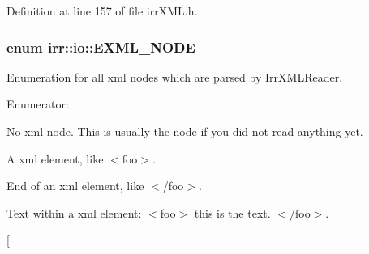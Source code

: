 Definition at line 157 of file irrXML.h.\hypertarget{namespaceirr_1_1io_86a02676c9cbb822e04d60c81b4f33ed}{
\subsubsection[{EXML\_\-NODE}]{\setlength{\rightskip}{0pt plus 5cm}enum {\bf irr::io::EXML\_\-NODE}}}
\label{namespaceirr_1_1io_86a02676c9cbb822e04d60c81b4f33ed}


Enumeration for all xml nodes which are parsed by IrrXMLReader. 

\begin{Desc}
\item[Enumerator: ]\par
\begin{description}
\item[{\em 
\hypertarget{namespaceirr_1_1io_86a02676c9cbb822e04d60c81b4f33eda7f8e643a481d9c8b75a25499f40235c}{
EXN\_\-NONE}
\label{namespaceirr_1_1io_86a02676c9cbb822e04d60c81b4f33eda7f8e643a481d9c8b75a25499f40235c}
}]No xml node. This is usually the node if you did not read anything yet. \item[{\em 
\hypertarget{namespaceirr_1_1io_86a02676c9cbb822e04d60c81b4f33ed9df4f5baccc23a0ad1f6fa64d8de2fc0}{
EXN\_\-ELEMENT}
\label{namespaceirr_1_1io_86a02676c9cbb822e04d60c81b4f33ed9df4f5baccc23a0ad1f6fa64d8de2fc0}
}]A xml element, like $<$foo$>$. \item[{\em 
\hypertarget{namespaceirr_1_1io_86a02676c9cbb822e04d60c81b4f33ed54ef1997279f08180634f4a897f771b8}{
EXN\_\-ELEMENT\_\-END}
\label{namespaceirr_1_1io_86a02676c9cbb822e04d60c81b4f33ed54ef1997279f08180634f4a897f771b8}
}]End of an xml element, like $<$/foo$>$. \item[{\em 
\hypertarget{namespaceirr_1_1io_86a02676c9cbb822e04d60c81b4f33ed0edf973f8ca0f6097f69369539d432a4}{
EXN\_\-TEXT}
\label{namespaceirr_1_1io_86a02676c9cbb822e04d60c81b4f33ed0edf973f8ca0f6097f69369539d432a4}
}]Text within a xml element: $<$foo$>$ this is the text. $<$/foo$>$. \item[{\em 
}
\end{description}
\end{Desc}
